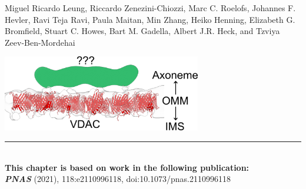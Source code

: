  \label{ch-4}
\vspace*{0.25cm}

\footnotesize Miguel Ricardo Leung, Riccardo Zenezini-Chiozzi, Marc C. Roelofs, Johannes F. Hevler, Ravi Teja Ravi, Paula Maitan, Min Zhang, Heiko Henning, Elizabeth G. Bromfield, Stuart C. Howes, Bart M. Gadella, Albert J.R. Heck, and Tzviya Zeev-Ben-Mordehai
%
\begin{center}
	\vspace{1.5cm}
	\includegraphics[width=0.65\textwidth]{Chapter.4/Figures/Chapter_cover.png}
	\vspace{0.5cm}
\end{center}
%
\begin{flushleft}
	\vspace*{\fill}
	\rule{\textwidth}{1pt}\\[0cm]
	\textbf{This chapter is based on work in the following publication:}\\
	\footnotesize
	\textbf{\emph{PNAS}} (2021), 118:e2110996118, doi:10.1073/pnas.2110996118\\
\end{flushleft}
